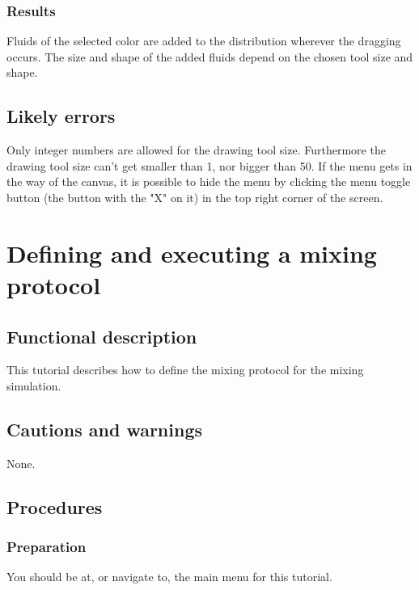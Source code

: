 \subsubsection{Results}
Fluids of the selected color are added to the distribution wherever the dragging occurs. The size and shape of the added fluids depend on the chosen tool size and shape.

\subsection{Likely errors}
Only integer numbers are allowed for the drawing tool size. Furthermore the drawing tool size can't get smaller than 1, nor bigger than 50. If the menu gets in the way of the canvas, it is possible to hide the menu by clicking the menu toggle button (the button with the "X" on it) in the top right corner of the screen.


\section{Defining and executing a mixing protocol}
\label{sec:defineMixProt}

\subsection{Functional description}
This tutorial describes how to define the mixing protocol for the mixing simulation.

\subsection{Cautions and warnings}
None.

\subsection{Procedures}
\subsubsection{Preparation}
%
You should be at, or navigate to, the main menu for this tutorial.

